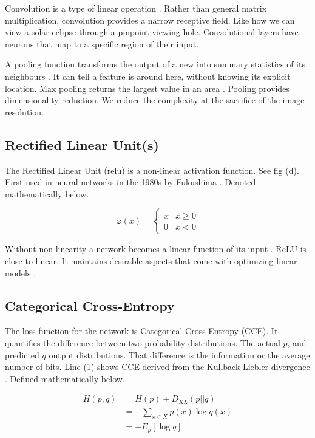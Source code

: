 Convolution is a type of linear operation \cite{goodfellow2016deep}. Rather than general matrix multiplication, convolution provides a narrow receptive field. Like how we can view a solar eclipse through a pinpoint viewing hole. Convolutional layers have neurons that map to a specific region of their input.

A pooling function transforms the output of a new into summary statistics of its neighbours \cite{goodfellow2016deep}. It can tell a feature is around here, without knowing its explicit location. Max pooling returns the largest value in an area \cite{zhou1988image}. Pooling provides dimensionality reduction. We reduce the complexity at the sacrifice of the image resolution.

\subsection{Rectified Linear Unit(s)}
\label{sec:relu}

The Rectified Linear Unit (relu) is a non-linear activation function. See fig (d). First used in neural networks in the 1980s by Fukushima \cite{fukushima1982neocognitron}. Denoted mathematically below.

\[ \varphi (x) = \begin{cases}
        x & x \ge 0 \\
        0 & x < 0
    \end{cases}
\]

Without non-linearity a network becomes a linear function of its input \cite{goodfellow2016deep}. ReLU is close to linear. It maintains desirable aspects that come with optimizing linear models \cite{goodfellow2016deep}.

\subsection{Categorical Cross-Entropy}
\label{sec:categorical-cross-entropy}

The loss function for the network is Categorical Cross-Entropy (CCE). It quantifies the difference between two probability distributions. The actual $p$, and predicted $q$ output distributions. That difference is the information or the average number of bits. Line (1) shows CCE derived from the Kullback-Liebler divergence \cite{kullback1951information}. Defined mathematically below.

\begin{align}
    H(p,q) & = H(p) + D_{KL}(p||q)             \\
           & = - \sum_{x \in X} p(x) \log q(x) \\
           & = - E_p [\log q]
\end{align}

